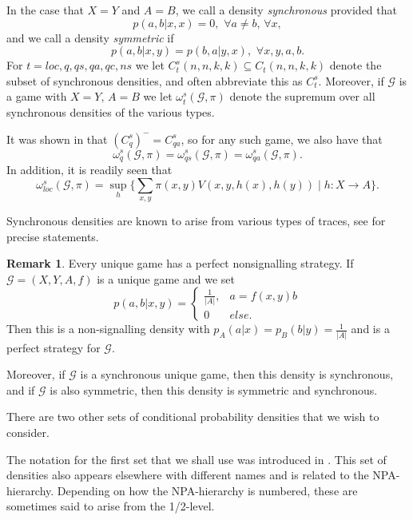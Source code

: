 \documentclass[11pt]{amsart}
\theoremstyle{definition}
\newtheorem{remark}[thm]{Remark}
\newcommand{\cl}[1]{\mathcal{#1}}
\begin{document}
In the case that $X=Y$ and $A=B$, we call a density {\it synchronous} provided that
\[ p(a,b| x,x) =0, \,\, \forall a \ne b, \, \forall x,\]
and we call a density {\it symmetric} if
\[ p(a,b|x,y)=p(b,a|y,x),\,\,\forall x,y,a,b.\]
For $t= loc, q, qs, qa, qc, ns$ we let $C_t^s(n,n,k,k) \subseteq C_t(n,n,k,k)$ denote the subset of synchronous densities, and often abbreviate this as $C_t^s$.
Moreover, if $\cl G$ is a game with $X=Y, \, A=B$ we let $\omega_t^s(\cl G, \pi)$ denote the supremum over all synchronous densities of the various types.

It was shown in \cite{KPS} that $(C_q^s)^- = C_{qa}^s$, so for any such game, we also have that
\[ \omega^s_q(\cl G, \pi) = \omega_{qs}^s(\cl G, \pi) = \omega_{qa}^s(\cl G, \pi).\]
In addition, it is readily seen that
\[ \omega^s_{loc}(\cl G, \pi) = \sup_h \{ \sum_{x,y} \pi(x,y) V(x, y,h(x), h(y)) \mid h:X \to A \}.\]

 Synchronous densities are known to arise from various types of traces, see \cite{KPS, HMNPR, HP} for precise statements.

\begin{remark} Every unique game has a perfect nonsignalling strategy. If $\cl G=(X,Y,A,f)$ is a unique game and we set
 \[ p(a,b|x,y) = \begin{cases} \frac{1}{|A|}, & a=f(x,y)b \\ 0 & else. \end{cases}\]
 Then this is a non-signalling density with $p_A(a|x) = p_B(b|y) = \frac{1}{|A|}$ and is a perfect strategy for $\cl G$.

 Moreover, if $\cl G$ is a synchronous unique game, then this density is synchronous, and if $\cl G$ is also symmetric, then this density is symmetric and synchronous.
 \end{remark}

There are two other sets of conditional probability densities that we wish to consider.

The notation for the first set that we shall use was introduced in \cite{PT}. This set of densities also appears elsewhere with different names and is related to the NPA-hierarchy. Depending on how the NPA-hierarchy is numbered, these are sometimes said to arise from the 1/2-level.
\end{document}
